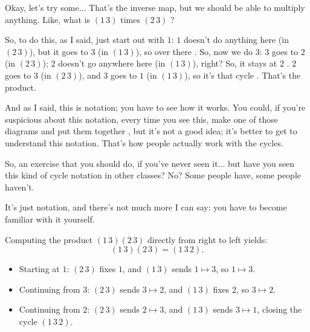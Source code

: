 \begin{speech}[01:12:53 - 01:14:18]
Okay, let's try some... That's the inverse map, but we should be able to multiply anything. Like, what is $(1\,3)$ times $(2\,3)$ ?

So, to do this, as I said, just start out with $1$: $1$ doesn't do anything here (in $(2\,3)$), but it goes to $3$ (in $(1\,3)$), so over there . So, now we do $3$: $3$ goes to $2$ (in $(2\,3)$); $2$ doesn't go anywhere here (in $(1\,3)$), right? So, it stays at $2$ . $2$ goes to $3$ (in $(2\,3)$), and $3$ goes to $1$ (in $(1\,3)$), so it's that cycle . That's the product.

And as I said, this is notation; you have to see how it works. You could, if you're suspicious about this notation, every time you see this, make one of those diagrams and put them together , but it's not a good idea; it's better to get to understand this notation. That's how people actually work with the cycles.

So, an exercise that you should do, if you've never seen it... but have you seen this kind of cycle notation in other classes? No? Some people have, some people haven't.

It's just notation, and there's not much more I can say: you have to become familiar with it yourself. 
\end{speech}

\begin{content}
Computing the product $(1\,3)(2\,3)$ directly from right to left yields:
\[
(1\,3)(2\,3) = (1\,3\,2).
\]

\begin{steps}
\begin{itemize}
    \item Starting at $1$: $(2\,3)$ fixes $1$, and $(1\,3)$ sends $1 \mapsto 3$, so $1 \mapsto 3$.
    \item Continuing from $3$: $(2\,3)$ sends $3 \mapsto 2$, and $(1\,3)$ fixes $2$, so $3 \mapsto 2$.
    \item Continuing from $2$: $(2\,3)$ sends $2 \mapsto 3$, and $(1\,3)$ sends $3 \mapsto 1$, closing the cycle $(1\,3\,2)$.
\end{itemize}
\end{steps}
\end{content}

